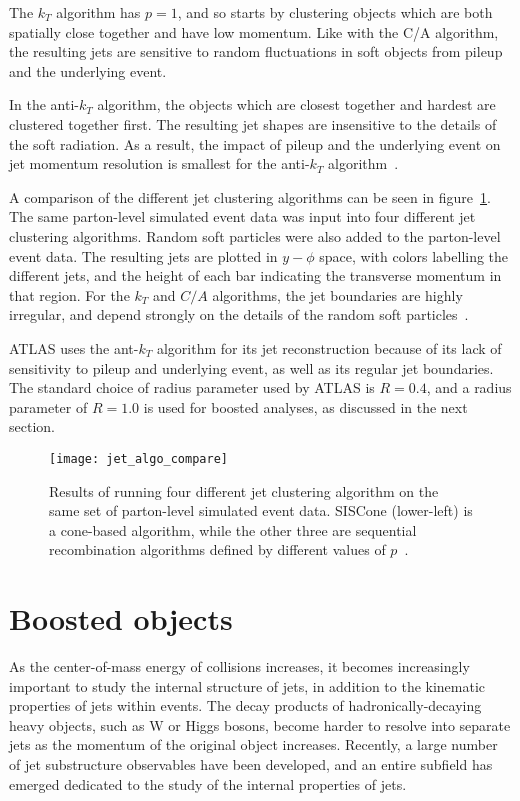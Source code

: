 The $k_T$ algorithm has $p=1$, and so starts by clustering objects which are both spatially close together and have low momentum.
Like with the C/A algorithm, the resulting jets are sensitive to random fluctuations in soft objects from pileup and the underlying event.

In the anti-$k_T$ algorithm, the objects which are closest together and hardest are clustered together first.
The resulting jet shapes are insensitive to the details of the soft radiation.
As a result, the impact of pileup and the underlying event on jet momentum resolution is smallest for the anti-$k_T$ algorithm~\cite{jet-antikt-algo}.

A comparison of the different jet clustering algorithms can be seen in figure~\ref{fig:jet_algo_compare}.
The same parton-level simulated event data was input into four different jet clustering algorithms.
Random soft particles were also added to the parton-level event data.
The resulting jets are plotted in $y-\phi$ space, with colors labelling the different jets, and the height of each bar indicating the transverse momentum in that region.
For the $k_T$ and $C/A$ algorithms, the jet boundaries are highly irregular, and depend strongly on the details of the random soft particles~\cite{jet-antikt-algo}.

ATLAS uses the ant-$k_T$ algorithm for its jet reconstruction because of its lack of sensitivity to pileup and underlying event, as well as its regular jet boundaries.
The standard choice of radius parameter used by ATLAS is $R=0.4$, and a radius parameter of $R=1.0$ is used for boosted analyses, as discussed in the next section.

\begin{figure}[!ht]
    \centering
\texttt{[image: jet\_algo\_compare]}
\caption{Results of running four different jet clustering algorithm on the same set of parton-level simulated event data.
SISCone (lower-left) is a cone-based algorithm, while the other three are sequential recombination algorithms defined
by different values of $p$~\cite{jet-antikt-algo}.}
\label{fig:jet_algo_compare}
\end{figure}

\section{Boosted objects}\label{sec:jet_substructure}

As the center-of-mass energy of collisions increases, it becomes increasingly important to study the internal structure
of jets, in addition to the kinematic properties of jets within events.
The decay products of hadronically-decaying heavy objects, such as W or Higgs bosons,
become harder to resolve into separate jets as the momentum of the original object increases.
Recently, a large number of jet substructure observables have been developed, and an entire subfield has emerged
dedicated to the study of the internal properties of jets.

